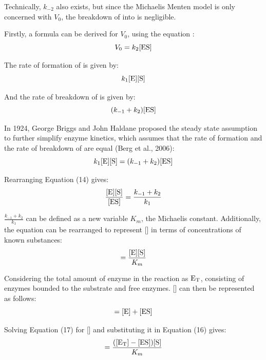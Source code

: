 \documentclass{article}
\begin{document}
\medskip

Technically, $k_{-2}$ also exists, but since the Michaelis Menten model is only concerned with $V_0$, the breakdown of  into  is negligible.

\medskip

Firstly, a formula can be derived for $V_0$, using the equation :
\begin{equation}
    V_0 = k_2[\ce{ES}]
\end{equation}

The rate of formation of  is given by:
\begin{equation}
    k_1[\ce{E}][\ce{S}]
\end{equation}

And the rate of breakdown of  is given by:
\begin{equation}
    (k_{-1} + k_2) [\ce{ES}]
\end{equation}

In 1924, George Briggs and John Haldane proposed the steady state assumption to further simplify enzyme kinetics, which assumes that the rate of formation and the rate of breakdown of  are equal (Berg et al., 2006):
\begin{equation}
    k_1[\ce{E}][\ce{S}] = (k_{-1} + k_2) [\ce{ES}]
\end{equation}

Rearranging Equation (14) gives:
\begin{equation}
    \frac{[\ce{E}][\ce{S}]}{[\ce{ES}]} = \frac{k_{-1}+k_2}{k_1}
\end{equation}

$\frac{k_{-1}+k_2}{k_1}$ can be defined as a new variable $K_m$, the Michaelis constant. Additionally, the equation can be rearranged to represent [] in terms of concentrations of known substances:
\begin{equation}
    [\ce{ES}] = \frac{[\ce{E}][\ce{S}]}{K_m}
\end{equation}

Considering the total amount of enzyme in the reaction as $\ce{E_T}$, consisting of enzymes bounded to the substrate and free enzymes. [] can then be represented as follows:
\begin{equation}
    [\ce{E_T}] = [\ce{E}] + [\ce{ES}]
\end{equation}

Solving Equation (17) for [] and substituting it in Equation (16) gives:
\begin{equation}
    [\ce{ES}] = \frac{([\ce{E_T}] - [\ce{ES}]) [\ce{S}]}{K_m}
\end{equation}
\end{document}
